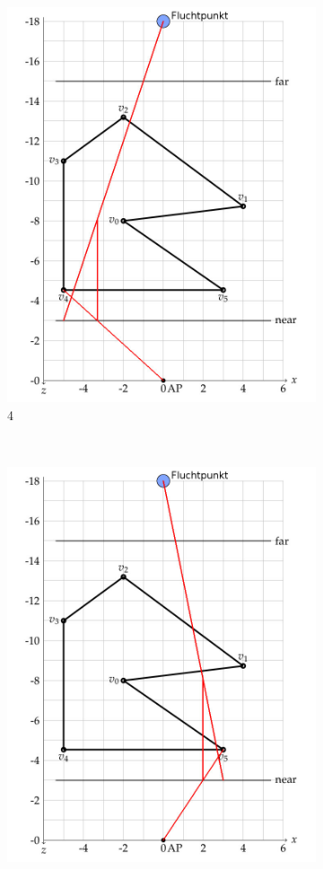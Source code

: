 \documentclass[a4paper,10pt,DIV=14]{article}
\begin{document}
\begin{figure}[H]
\begin{subfigure}{0.3\textwidth}
		\includegraphics[width=\textwidth]{2b_4}
		\caption{4}
	\end{subfigure}
	~
	\begin{subfigure}{0.3\textwidth}
		\includegraphics[width=\textwidth]{2b_5}

\end{subfigure}
\end{figure}
\end{document}
